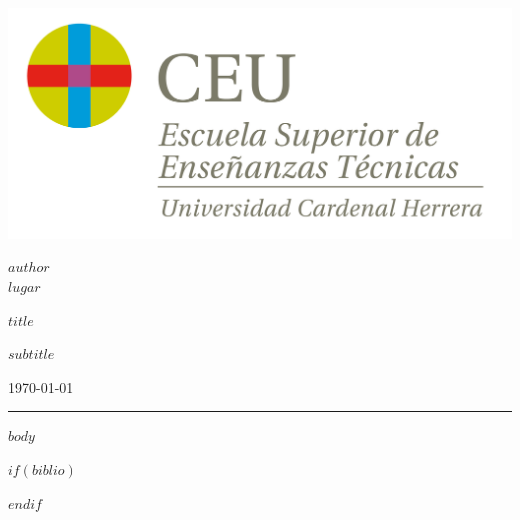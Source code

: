 \documentclass[$fontsize$,a4paper,twoside,onecolumn]{scrartcl}
\subtitle{$subtitle$}
\date{$date$}
\newcommand{\mititulo}{ $title$ }
\newcommand{\misubtitulo}{ $subtitle$ }
\newcommand{\ELautor}{$author$}
\newcommand{\dedonde}{$lugar$}
\begin{document}
\thispagestyle{empty}
	
\begin{minipage}[c]{0.29\textwidth}
	\includegraphics[width=\linewidth]{00_fac_eset.png}
\end{minipage}
\begin{minipage}[r]{0.7\textwidth}
	\begin{flushright}
		\large
		\ELautor \\
		\dedonde \\[0.1cm]
	\end{flushright}
	
\end{minipage}

\begin{flushright}
	\Huge 
	
	\mititulo \\[0.4cm]
	
	\Large
	
	\misubtitulo \\[0.5cm]
	
\end{flushright}
\today\\
\hrule
\renewcommand{\tablename}{Tabla}
\renewcommand{\contentsname}{Contenidos}




$body$

$if(biblio)$
	
	
$endif$
\end{document}
